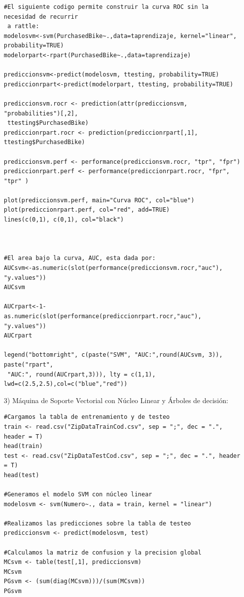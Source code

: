 \documentclass[11pt,a4paper]{report}
\begin{document}
\begin{itemize}
\begin{verbatim}
#El siguiente codigo permite construir la curva ROC sin la necesidad de recurrir
 a rattle:
modelosvm<-svm(PurchasedBike~.,data=taprendizaje, kernel="linear", probability=TRUE)
modelorpart<-rpart(PurchasedBike~.,data=taprendizaje)

prediccionsvm<-predict(modelosvm, ttesting, probability=TRUE)
prediccionrpart<-predict(modelorpart, ttesting, probability=TRUE)

prediccionsvm.rocr <- prediction(attr(prediccionsvm, "probabilities")[,2],
 ttesting$PurchasedBike)
prediccionrpart.rocr <- prediction(prediccionrpart[,1], ttesting$PurchasedBike)

prediccionsvm.perf <- performance(prediccionsvm.rocr, "tpr", "fpr")
prediccionrpart.perf <- performance(prediccionrpart.rocr, "fpr", "tpr" )

plot(prediccionsvm.perf, main="Curva ROC", col="blue")
plot(prediccionrpart.perf, col="red", add=TRUE)
lines(c(0,1), c(0,1), col="black")



#El area bajo la curva, AUC, esta dada por:
AUCsvm<-as.numeric(slot(performance(prediccionsvm.rocr,"auc"), "y.values"))
AUCsvm

AUCrpart<-1- as.numeric(slot(performance(prediccionrpart.rocr,"auc"), "y.values"))
AUCrpart

legend("bottomright", c(paste("SVM", "AUC:",round(AUCsvm, 3)), paste("rpart",
 "AUC:", round(AUCrpart,3))), lty = c(1,1), lwd=c(2.5,2.5),col=c("blue","red"))

\end{verbatim}



\item[3)] Máquina de Soporte Vectorial con Núcleo Linear y Árboles de decisión:
\begin{verbatim}
#Cargamos la tabla de entrenamiento y de testeo
train <- read.csv("ZipDataTrainCod.csv", sep = ";", dec = ".", header = T)
head(train)
test <- read.csv("ZipDataTestCod.csv", sep = ";", dec = ".", header = T)
head(test)

#Generamos el modelo SVM con núcleo linear
modelosvm <- svm(Numero~., data = train, kernel = "linear")

#Realizamos las predicciones sobre la tabla de testeo
prediccionsvm <- predict(modelosvm, test)

#Calculamos la matriz de confusion y la precision global
MCsvm <- table(test[,1], prediccionsvm)
MCsvm
PGsvm <- (sum(diag(MCsvm)))/(sum(MCsvm))
PGsvm


\end{verbatim}
\end{itemize}
\end{document}
